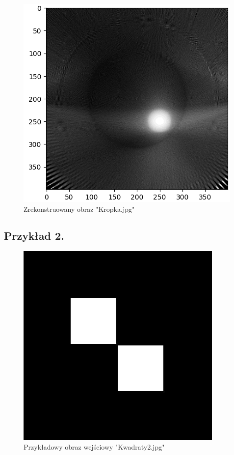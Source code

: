 \documentclass[a4paper,11pt]{article}
\begin{document}
    \begin{figure}[H]
    \centering
    \includegraphics[scale=0.4]{Kropka_reconstructed.png}
    \caption{Zrekonstruowany obraz "Kropka.jpg"}
  \end{figure}

  \subsection{Przykład 2.}
  
  \begin{figure}[H]
    \centering
    \includegraphics[scale=0.32]{Kwadraty2.jpg}
    \caption{Przykładowy obraz wejściowy "Kwadraty2.jpg"}
  \end{figure}
  
\end{document}
